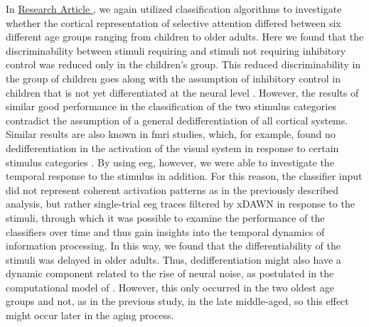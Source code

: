 In \hyperref[results:paperII]{Research Article }, we again utilized classification algorithms to investigate whether the cortical representation of selective attention differed between six different age groups ranging from children to older adults. Here we found that the discriminability between stimuli requiring and stimuli not requiring inhibitory control was reduced only in the children's group. This reduced discriminability in the group of children goes along with the assumption of inhibitory control in children that is not yet differentiated at the neural level \cite{Waszak2010, Reuter2019}. However, the results of similar good performance in the classification of the two stimulus categories contradict the assumption of a general dedifferentiation of all cortical systems. Similar results are also known in \gls{fmri} studies, which, for example, found no dedifferentiation in the activation of the visual system in response to certain stimulus categories \cite{Voss2008}. By using \gls{eeg}, however, we were able to investigate the temporal response to the stimulus in addition. For this reason, the classifier input did not represent coherent activation patterns as in the previously described analysis, but rather single-trial \gls{eeg} traces filtered by xDAWN in response to the stimuli, through which it was possible to examine the performance of the classifiers over time and thus gain insights into the temporal dynamics of information processing. In this way, we found that the differentiability of the stimuli was delayed in older adults. Thus, dedifferentiation might also have a dynamic component related to the rise of neural noise, as postulated in the computational model of \citeauthor{Li2001} \cite{Li2001, Li2000}. However, this only occurred in the two oldest age groups and not, as in the previous study, in the late middle-aged, so this effect might occur later in the aging process.


